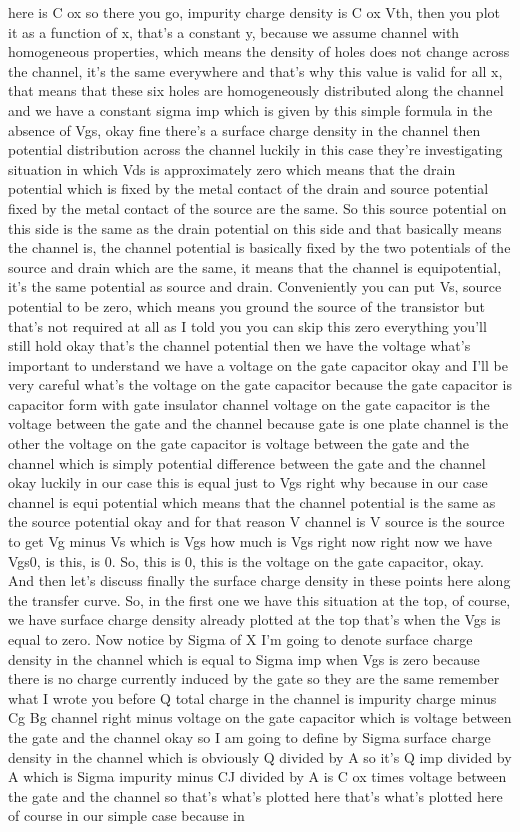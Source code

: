 here is C ox so there you go, impurity charge density is C ox Vth, then you plot it as a function of x, that's a constant y, because we assume channel with homogeneous properties, which means the density of holes does not change across the channel, it's the same everywhere and that's why this value is valid for all x, that means that these six holes are homogeneously distributed along the channel and we have a constant sigma imp which is given by this simple formula in the absence of Vgs, okay fine there's a surface charge density in the channel then potential distribution across the channel luckily in this case they're investigating situation in which Vds is approximately zero which means that the drain potential which is fixed by the metal contact of the drain and source potential fixed by the metal contact of the source are the same. So this source potential on this side is the same as the drain potential on this side and that basically means the channel is, the channel potential is basically fixed by the two potentials of the source and drain which are the same, it means that the channel is equipotential, it's the same potential as source and drain. Conveniently you can put Vs, source potential to be zero, which means you ground the source of the transistor but that's not required at all as I told you you can skip this zero everything you'll still hold okay that's the channel potential then we have the voltage what's important to understand we have a voltage on the gate capacitor okay and I'll be very careful what's the voltage on the gate capacitor because the gate capacitor is capacitor form with gate insulator channel voltage on the gate capacitor is the voltage between the gate and the channel because gate is one plate channel is the other the voltage on the gate capacitor is voltage between the gate and the channel which is simply potential difference between the gate and the channel okay luckily in our case this is equal just to Vgs right why because in our case channel is equi potential which means that the channel potential is the same as the source potential okay and for that reason V channel is V source is the source to get Vg minus Vs which is Vgs how much is Vgs right now right now we have Vgs0, is this, is 0. So, this is 0, this is the voltage on the gate capacitor, okay. And then let's discuss finally the surface charge density in these points here along the transfer curve. So, in the first one we have this situation at the top, of course, we have surface charge density already plotted at the top that's when the Vgs is equal to zero. Now notice by Sigma of X I'm going to denote surface charge density in the channel which is equal to Sigma imp when Vgs is zero because there is no charge currently induced by the gate so they are the same remember what I wrote you before Q total charge in the channel is impurity charge minus Cg Bg channel right minus voltage on the gate capacitor which is voltage between the gate and the channel okay so I am going to define by Sigma surface charge density in the channel which is obviously Q divided by A so it's Q imp divided by A which is Sigma impurity minus CJ divided by A is C ox times voltage between the gate and the channel so that's what's plotted here that's what's plotted here of course in our simple case because in 